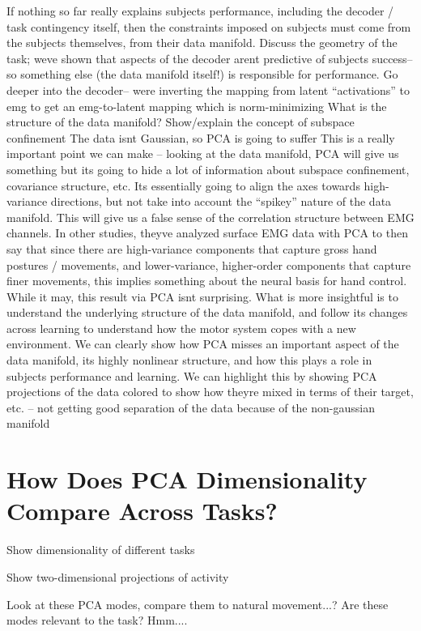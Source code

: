 \documentclass[../main.tex]{subfiles}
\begin{document}
If nothing so far really explains subjects performance, including the decoder / task contingency itself, then the constraints imposed on subjects must come from the subjects themselves, from their data manifold.
Discuss the geometry of the task; weve shown that aspects of the decoder arent predictive of subjects success– so something else (the data manifold itself!) is responsible for performance.
Go deeper into the decoder– were inverting the mapping from latent “activations” to emg to get an emg-to-latent mapping which is norm-minimizing 
What is the structure of the data manifold? 
Show/explain the concept of subspace confinement
The data isnt Gaussian, so PCA is going to suffer
This is a really important point we can make – looking at the data manifold, PCA will give us something but its going to hide a lot of information about subspace confinement, covariance structure, etc. Its essentially going to align the axes towards high-variance directions, but not take into account the “spikey” nature of the data manifold. This will give us a false sense of the correlation structure between EMG channels.
In other studies, theyve analyzed surface EMG data with PCA to then say that since there are high-variance components that capture gross hand postures / movements, and lower-variance, higher-order components that capture finer movements, this implies something about the neural basis for hand control. While it may, this result via PCA isnt surprising. What is more insightful is to understand the underlying structure of the data manifold, and follow its changes across learning to understand how the motor system copes with a new environment. We can clearly show how PCA misses an important aspect of the data manifold, its highly nonlinear structure, and how this plays a role in subjects performance and learning.
We can highlight this by showing PCA projections of the data colored to show how theyre mixed in terms of their target, etc. – not getting good separation of the data because of the non-gaussian manifold



\section{How Does PCA Dimensionality Compare Across Tasks?}

Show dimensionality of different tasks

Show two-dimensional projections of activity

Look at these PCA modes, compare them to natural movement...? Are these modes relevant to the task? Hmm....
\end{document}
